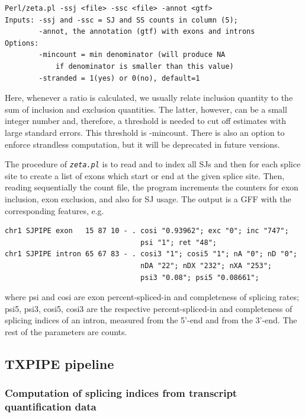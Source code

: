 \documentclass{article}
\newcommand{\prog}[1]{{\tt\em #1}}
\begin{document}
\begin{verbatim}
Perl/zeta.pl -ssj <file> -ssc <file> -annot <gtf>
Inputs: -ssj and -ssc = SJ and SS counts in column (5);
        -annot, the annotation (gtf) with exons and introns
Options:
        -mincount = min denominator (will produce NA 
            if denominator is smaller than this value)
        -stranded = 1(yes) or 0(no), default=1
\end{verbatim}
Here, whenever a ratio is calculated, we usually relate inclusion quantity to the sum of inclusion and exclusion quantities. The latter, however, can be a 
small integer number and, therefore, a threshold is needed to cut off estimates with large standard errors. This threshold is -mincount. There is also an option 
to enforce strandless computation, but it will be deprecated in future versions.

The procedure of \prog{zeta.pl} is to read and to index all SJs and then for each splice site to create a list of exons which start or end at the given splice site. 
Then, reading sequentially the count file, the program increments the counters for exon inclusion, exon exclusion, and also for SJ usage. The output is a GFF with 
the corresponding features, e.g.
\begin{verbatim}
chr1 SJPIPE exon   15 87 10 - . cosi "0.93962"; exc "0"; inc "747"; 
                                psi "1"; ret "48";
chr1 SJPIPE intron 65 67 83 - . cosi3 "1"; cosi5 "1"; nA "0"; nD "0"; 
                                nDA "22"; nDX "232"; nXA "253"; 
                                psi3 "0.08"; psi5 "0.08661";
\end{verbatim}
where psi and cosi are exon percent-spliced-in and completeness of splicing rates; psi5, psi3, cosi5, cosi3 
are the respective percent-spliced-in and completeness of splicing indices of an intron, measured from the 
5'-end and from the 3'-end. The rest of the parameters are counts.


\subsection{TXPIPE pipeline}
\label{sec::txpipe}
\subsubsection[Splicing indices from transcript quantification data]{Computation of splicing indices from transcript quantification data}
\end{document}
